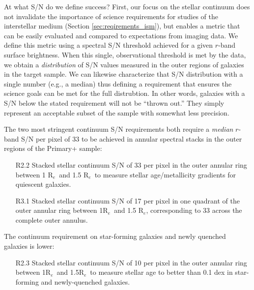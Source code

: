 \documentclass[preprint,11pt]{aastex}
\newcommand{\Hbeta}{{H$\beta$}}
\newcommand{\Reff}{{R$_{e}$}}
\begin{document}
At what S/N do we define success? First, our focus on the stellar continuum does not invalidate the importance of
science requirements for studies of the interstellar medium (Section \ref{sec:reqirements_ism}), but enables a metric
that can be easily evaluated and compared to expectations from imaging data.  We define this metric using a spectral
S/N threshold achieved for a given $r$-band surface brightness.  When this single, observational threshold is met by
the data, we obtain a {\em distribution} of S/N values measured in the outer regions of galaxies in the target sample.
We can likewise characterize that S/N distribution with a single number (e.g., a median) thus defining a requirement
that ensures the science goals can be met for the full distrubtion.  In other words, galaxies with a S/N below the
stated requirement will not be ``thrown out.''  They simply represent an acceptable subset of the sample with somewhat
less precision.

The two most stringent continuum S/N requirements both require a {\em median} $r$-band S/N per pixel of 33 to be achieved in annular spectral stacks in the outer
regions of the Primary+ sample:

\begin{itemize}
\item [R2.2] Stacked stellar continuum S/N of 33 per pixel in the outer annular ring between 1 \Reff\ and 1.5 \Reff\ to measure stellar age/metallicity gradients for quiescent galaxies.
\item [R3.1] Stacked stellar continuum S/N of 17 per pixel in one quadrant of the outer annular ring between 1\Reff\ and 1.5 \Reff, corresponding to 33 across the complete outer annulus.
\end{itemize}

\noindent The continuum requirement on star-forming galaxies and newly quenched galaxies is lower: 
\begin{itemize}
\item[R2.3] Stacked stellar continuum S/N of 10 per pixel in the outer annular ring between 1\Reff\ and 1.5\Reff\ to measure stellar age to better than 0.1 dex in star-forming and newly-quenched galaxies. 
\end{itemize}

\end{document}
